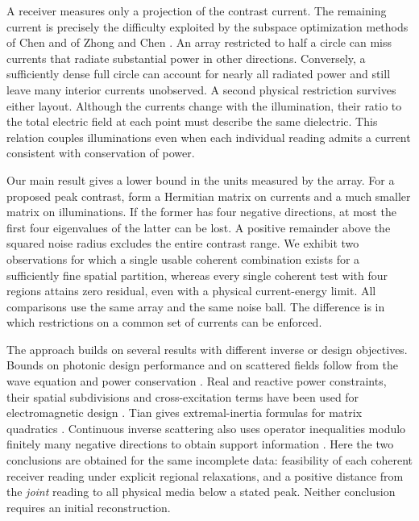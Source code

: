 \documentclass[anonymous,12pt]{iopjournal}
\numberwithin{equation}{section}
\begin{document}
A receiver measures only a projection of the contrast current. The remaining current is precisely the difficulty exploited by the subspace optimization methods of Chen and of Zhong and Chen \cite{chen,zhong,ffttsom}. An array restricted to half a circle can miss currents that radiate substantial power in other directions. Conversely, a sufficiently dense full circle can account for nearly all radiated power and still leave many interior currents unobserved. A second physical restriction survives either layout. Although the currents change with the illumination, their ratio to the total electric field at each point must describe the same dielectric. This relation couples illuminations even when each individual reading admits a current consistent with conservation of power.

Our main result gives a lower bound in the units measured by the array. For a proposed peak contrast, form a Hermitian matrix on currents and a much smaller matrix on illuminations. If the former has four negative directions, at most the first four eigenvalues of the latter can be lost. A positive remainder above the squared noise radius excludes the entire contrast range. We exhibit two observations for which a single usable coherent combination exists for a sufficiently fine spatial partition, whereas every single coherent test with four regions attains zero residual, even with a physical current-energy limit. All comparisons use the same array and the same noise ball. The difference is in which restrictions on a common set of currents can be enforced.

The approach builds on several results with different inverse or design objectives. Bounds on photonic design performance and on scattered fields follow from the wave equation and power conservation \cite{angeris19,trivedi,angeris}. Real and reactive power constraints, their spatial subdivisions and cross-excitation terms have been used for electromagnetic design \cite{moleskyglobal,moleskylocal,kuang,shim}. Tian gives extremal-inertia formulas for matrix quadratics \cite{tian}. Continuous inverse scattering also uses operator inequalities modulo finitely many negative directions to obtain support information \cite{griesmaier_harrach,griesmaier_harrach_erratum,albicker}. Here the two conclusions are obtained for the same incomplete data: feasibility of each coherent receiver reading under explicit regional relaxations, and a positive distance from the \emph{joint} reading to all physical media below a stated peak. Neither conclusion requires an initial reconstruction.
\end{document}
